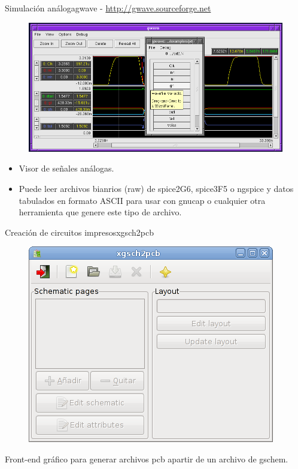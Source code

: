 \documentclass{beamer}
\begin{document}
\begin{frame}{Simulación análoga}{\alert{gwave} - \url{http://gwave.sourceforge.net}}
  \begin{figure}[!h]
    \centering
    \includegraphics[scale=0.25]{img/gwave.png}
  \end{figure}
  \begin{itemize}
  \item Visor de señales análogas.
  \item Puede leer archivos bianrios (raw) de spice2G6, spice3F5 o ngspice y datos tabulados en formato ASCII para usar con gnucap o cualquier otra herramienta que genere este tipo de archivo.
  \end{itemize}
\end{frame}

\begin{frame}{Creación de circuitos impresos}{xgsch2pcb}
  \begin{figure}[!h]
    \centering
    \includegraphics[scale=0.35]{img/xgsch2pcb.png}
  \end{figure}
  Front-end gráfico para generar archivos pcb apartir de un archivo de gschem.
\end{frame}
\end{document}
